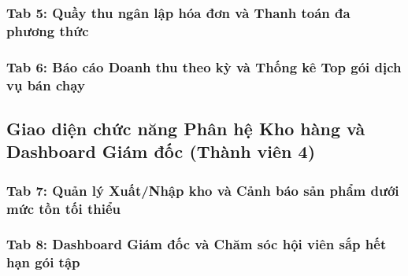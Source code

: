 \subsubsection{Tab 5: Quầy thu ngân lập hóa đơn và Thanh toán đa phương thức}

\subsubsection{Tab 6: Báo cáo Doanh thu theo kỳ và Thống kê Top gói dịch vụ bán chạy}

\subsection{Giao diện chức năng Phân hệ Kho hàng và Dashboard Giám đốc (Thành viên 4)}

\subsubsection{Tab 7: Quản lý Xuất/Nhập kho và Cảnh báo sản phẩm dưới mức tồn tối thiểu}

\subsubsection{Tab 8: Dashboard Giám đốc và Chăm sóc hội viên sắp hết hạn gói tập}
